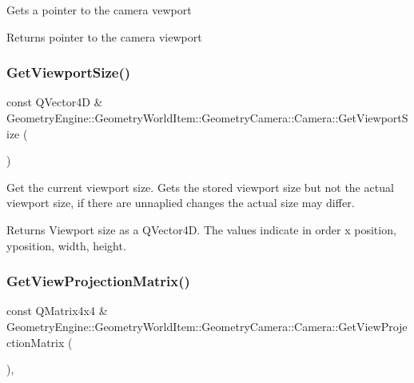 Gets a pointer to the camera vewport \begin{DoxyReturn}{Returns}
pointer to the camera viewport 
\end{DoxyReturn}
\mbox{\label{class_geometry_engine_1_1_geometry_world_item_1_1_geometry_camera_1_1_camera_a633facf8168c7bc943e256732cfb78dc}} 
\subsubsection{\texorpdfstring{GetViewportSize()}{GetViewportSize()}}
{\footnotesize\ttfamily const Q\+Vector4D \& Geometry\+Engine\+::\+Geometry\+World\+Item\+::\+Geometry\+Camera\+::\+Camera\+::\+Get\+Viewport\+Size (\begin{DoxyParamCaption}{ }\end{DoxyParamCaption})\hspace{0.3cm}{\ttfamily [virtual]}}

Get the current viewport size. Gets the stored viewport size but not the actual viewport size, if there are unnaplied changes the actual size may differ. \begin{DoxyReturn}{Returns}
Viewport size as a Q\+Vector4D. The values indicate in order x position, yposition, width, height. 
\end{DoxyReturn}
\mbox{\label{class_geometry_engine_1_1_geometry_world_item_1_1_geometry_camera_1_1_camera_a22afa49db8d7aa71d24b9fed728ab381}} 
\subsubsection{\texorpdfstring{GetViewProjectionMatrix()}{GetViewProjectionMatrix()}}
{\footnotesize\ttfamily const Q\+Matrix4x4 \& Geometry\+Engine\+::\+Geometry\+World\+Item\+::\+Geometry\+Camera\+::\+Camera\+::\+Get\+View\+Projection\+Matrix (\begin{DoxyParamCaption}{ }\end{DoxyParamCaption})\hspace{0.3cm}{\ttfamily [inline]}, {\ttfamily [virtual]}}

